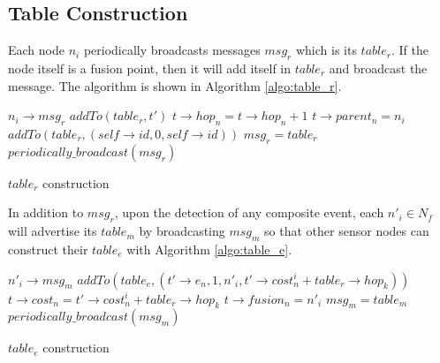 \subsection{Table Construction}
Each node \(n_i\) periodically broadcasts messages \(msg_r\) which is its \(table_r\). If the node itself is a fusion point, then it will add itself in \(table_r\) and broadcast the message. The algorithm is shown in Algorithm \ref{algo:table_r}.

\begin{algorithm}
\begin{algorithmic}
\REQUIRE \(n_i\rightarrow msg_r\)
			\STATE \(addTo(table_r, t')\)
		\ENDIF
					\STATE \(t\rightarrow hop_n = t\rightarrow hop_n+1\)
					\STATE \(t\rightarrow parent_n = n_i\)
				\ENDIF
			\ENDIF
		\ENDFOR
	\ENDFOR
		\STATE \(addTo(table_r, (self\rightarrow id, 0, self\rightarrow id))\)
	\ENDIF
	\STATE \(msg_r = table_r\)
	\STATE \(periodically\_broadcast(msg_r)\)
\end{algorithmic}
\caption{\(table_r\) construction}
\label{algo:table_r}
\end{algorithm}

In addition to \(msg_r\), upon the detection of any composite event, each \(n'_i\in N_f\) will  advertise its \(table_m\) by broadcasting \(msg_m\) so that other sensor nodes can construct their \(table_e\) with Algorithm \ref{algo:table_e}.

\begin{algorithm}
\begin{algorithmic}
\REQUIRE \(n'_i\rightarrow msg_m\)
			\STATE \(addTo(table_e, (t'\rightarrow e_n, 1, n'_i, t'\rightarrow cost_n^i+table_r\rightarrow hop_k))\)
		\ENDIF
					\STATE \(t\rightarrow cost_n = t'\rightarrow cost_n^i+table_r\rightarrow hop_k\)
					\STATE \(t\rightarrow fusion_n = n'_i\)
				\ENDIF
			\ENDIF
		\ENDFOR
	\ENDFOR
		\STATE \(msg_m = table_m\)
		\STATE \(periodically\_broadcast(msg_m)\)
	\ENDIF
\end{algorithmic}
\caption{\(table_e\) construction}
\label{algo:table_e}
\end{algorithm}

